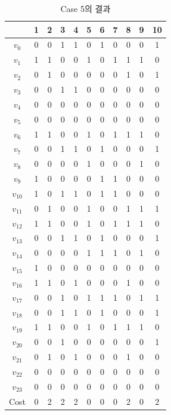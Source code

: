 \documentclass[12pt,a4paper]{article}
\begin{document}
    \begin{table}[htb!]
    \centering
    \begin{tabular}{c c c c c c c c c c c}
        & 1 & 2 & 3 & 4 & 5 & 6 & 7 & 8 & 9 & 10 \\
        \hline
        $v_0$ & 0 & 0 & 1 & 1 & 0 & 1 & 0 & 0 & 0 & 1 \\
        $v_1$ & 1 & 1 & 0 & 0 & 1 & 0 & 1 & 1 & 1 & 0 \\
        $v_2$ & 0 & 1 & 0 & 0 & 0 & 0 & 0 & 1 & 0 & 1 \\
        $v_3$ & 0 & 0 & 1 & 1 & 0 & 0 & 0 & 0 & 0 & 0 \\
        $v_4$ & 0 & 0 & 0 & 0 & 0 & 0 & 0 & 0 & 0 & 0 \\
        $v_5$ & 0 & 0 & 0 & 0 & 0 & 0 & 0 & 0 & 0 & 0 \\
        $v_6$ & 1 & 1 & 0 & 0 & 1 & 0 & 1 & 1 & 1 & 0 \\
        $v_7$ & 0 & 0 & 1 & 1 & 0 & 1 & 0 & 0 & 0 & 1 \\
        $v_8$ & 0 & 0 & 0 & 0 & 1 & 0 & 0 & 0 & 1 & 0 \\
        $v_9$ & 1 & 0 & 0 & 0 & 0 & 1 & 1 & 0 & 0 & 0 \\
        $v_{10}$ & 1 & 0 & 1 & 1 & 0 & 1 & 1 & 0 & 0 & 0 \\
        $v_{11}$ & 0 & 1 & 0 & 0 & 1 & 0 & 0 & 1 & 1 & 1 \\
        $v_{12}$ & 1 & 1 & 0 & 0 & 1 & 0 & 1 & 1 & 1 & 0 \\
        $v_{13}$ & 0 & 0 & 1 & 1 & 0 & 1 & 0 & 0 & 0 & 1 \\
        $v_{14}$ & 0 & 0 & 0 & 0 & 1 & 1 & 1 & 0 & 1 & 0 \\
        $v_{15}$ & 1 & 0 & 0 & 0 & 0 & 0 & 0 & 0 & 0 & 0 \\
        $v_{16}$ & 1 & 1 & 0 & 1 & 0 & 0 & 0 & 1 & 0 & 0 \\
        $v_{17}$ & 0 & 0 & 1 & 0 & 1 & 1 & 1 & 0 & 1 & 1 \\
        $v_{18}$ & 0 & 0 & 1 & 1 & 0 & 1 & 0 & 0 & 0 & 1 \\
        $v_{19}$ & 1 & 1 & 0 & 0 & 1 & 0 & 1 & 1 & 1 & 0 \\
        $v_{20}$ & 0 & 0 & 1 & 0 & 0 & 0 & 0 & 0 & 0 & 1 \\
        $v_{21}$ & 0 & 1 & 0 & 1 & 0 & 0 & 0 & 1 & 0 & 0 \\
        $v_{22}$ & 0 & 0 & 0 & 0 & 0 & 0 & 0 & 0 & 0 & 0 \\
        $v_{23}$ & 0 & 0 & 0 & 0 & 0 & 0 & 0 & 0 & 0 & 0 \\
        Cost & 0 & 2 & 2 & 2 & 0 & 0 & 0 & 2 & 0 & 2 \\
    \end{tabular}
    \caption{Case 5의 결과}
    \label{tab:result5}
    \end{table}
\end{document}
